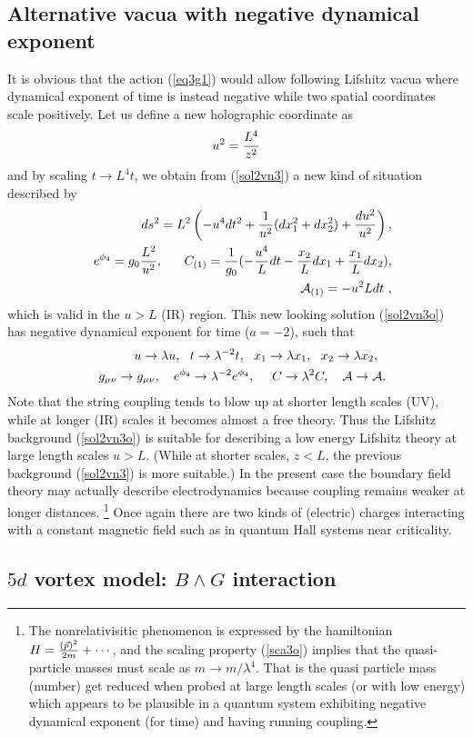 \documentclass[12pt]{article}
\def\be{\begin{equation}} \def\ee{\end{equation}}
\def\bea{\begin{eqnarray}} \def\eea{\end{eqnarray}} \def\ba{\begin{array}}
\newcommand{\eqn}[1]{(\ref{#1})}
\def\m{\mu}
\def\n{\nu}
\def\br{\nonumber\\}
\begin{document}
\subsection{ Alternative  vacua with negative dynamical exponent}
It is obvious that the action \eqn{eq3g1} would  allow following 
Lifshitz vacua where dynamical exponent of time is instead  negative 
while two spatial coordinates scale positively. Let us
define a new holographic coordinate as
\be\label{def5}
u^2= {L^4\over z^2}
\ee
and by scaling  $t\to L^4 t$, we  obtain from  \eqn{sol2vn3} a new
kind of situation described by  
\bea\label{sol2vn3o}
&&ds^2=L^2\left(- { u^4 dt^2} +{1\over u^2}(dx_1^2+dx_2^2)+{du^2\over
u^2} \right)    ,\br
&&e^{\phi_4}=g_0{L^2 \over u^2}, ~~~~~
C_{(1)}= {1\over g_0}(-{u^4 \over L}  dt - {x_2\over L} dx_1 +{x_1\over L}dx_2),  \br 
&& {\cal{A}}_{(1)}=  -{u^2  L}dt  \ ,
\eea
which is valid in the $u> L$ (IR) region. This new  looking solution 
\eqn{sol2vn3o}  has negative
dynamical exponent for time ($a=-2$), such that
\bea\label{sca3o}
&& u\to\lambda u, ~~
t\to\lambda^{-2} t,~~ 
x_1\to\lambda x_1,~~ 
x_2\to\lambda x_2,~~ \br
&& g_{\m\n}\to g_{\m\n},~~~e^{\phi_4}\to \lambda^{-2} e^{\phi_4}, ~~~~
C\to\lambda^{2} C ,~~~
 {\cal{A}} \to {\cal{A}} .
\eea
Note  that the string
coupling tends to blow up at shorter length scales (UV), 
while at longer  (IR) scales it becomes almost a free theory. 
Thus the Lifshitz background \eqn{sol2vn3o} is suitable for 
describing a low energy Lifshitz theory
at large length scales $u>L$. (While at shorter  scales, $z<L$, the previous 
background \eqn{sol2vn3} is more suitable.)
In the present case the boundary field theory
may actually describe electrodynamics because coupling remains 
weaker at longer distances. 
\footnote{ The nonrelativisitic
phenomenon  is expressed 
by the hamiltonian $H={(\vec{p})^2 \over 2m} + \cdots$, and  the scaling
property \eqn{sca3o} implies that the quasi-particle masses 
must scale as $m\to m/\lambda^4 $. That is the quasi particle
mass (number) get reduced when  probed at large length scales 
(or with low energy) which appears to be
plausible in a quantum system exhibiting negative dynamical
exponent (for time) and having running coupling.}
 Once again there are two kinds of
(electric) charges interacting with a constant magnetic field such as in
quantum Hall systems near criticality.  

 
\subsection{ $5d$ vortex model: $B\wedge G$ interaction}
\end{document}
